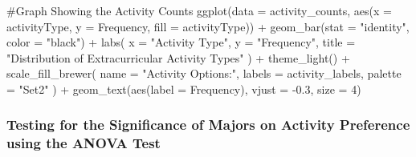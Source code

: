\documentclass[
  letterpaper,
  DIV=11,
  numbers=noendperiod]{scrartcl}
\newenvironment{Shaded}{\begin{snugshade}}{\end{snugshade}}
\newcommand{\AttributeTok}[1]{\textcolor[rgb]{0.40,0.45,0.13}{#1}}
\newcommand{\CommentTok}[1]{\textcolor[rgb]{0.37,0.37,0.37}{#1}}
\newcommand{\DecValTok}[1]{\textcolor[rgb]{0.68,0.00,0.00}{#1}}
\newcommand{\FloatTok}[1]{\textcolor[rgb]{0.68,0.00,0.00}{#1}}
\newcommand{\FunctionTok}[1]{\textcolor[rgb]{0.28,0.35,0.67}{#1}}
\newcommand{\NormalTok}[1]{\textcolor[rgb]{0.00,0.23,0.31}{#1}}
\newcommand{\SpecialCharTok}[1]{\textcolor[rgb]{0.37,0.37,0.37}{#1}}
\newcommand{\StringTok}[1]{\textcolor[rgb]{0.13,0.47,0.30}{#1}}
\begin{document}
\begin{Shaded}
\begin{Highlighting}[]
\CommentTok{\#Graph Showing the Activity Counts}
\FunctionTok{ggplot}\NormalTok{(}\AttributeTok{data =}\NormalTok{ activity\_counts, }\FunctionTok{aes}\NormalTok{(}\AttributeTok{x =}\NormalTok{ activityType, }\AttributeTok{y =}\NormalTok{ Frequency, }
                                   \AttributeTok{fill =}\NormalTok{ activityType)) }\SpecialCharTok{+}
  \FunctionTok{geom\_bar}\NormalTok{(}\AttributeTok{stat =} \StringTok{"identity"}\NormalTok{, }\AttributeTok{color =} \StringTok{"black"}\NormalTok{) }\SpecialCharTok{+}
  \FunctionTok{labs}\NormalTok{(}
    \AttributeTok{x =} \StringTok{"Activity Type"}\NormalTok{,}
    \AttributeTok{y =} \StringTok{"Frequency"}\NormalTok{,}
    \AttributeTok{title =} \StringTok{"Distribution of Extracurricular Activity Types"}
\NormalTok{  ) }\SpecialCharTok{+}
  \FunctionTok{theme\_light}\NormalTok{() }\SpecialCharTok{+}
  \FunctionTok{scale\_fill\_brewer}\NormalTok{(}
    \AttributeTok{name =} \StringTok{"Activity Options:"}\NormalTok{,}
    \AttributeTok{labels =}\NormalTok{ activity\_labels,  }
    \AttributeTok{palette =} \StringTok{"Set2"}  
\NormalTok{  ) }\SpecialCharTok{+}
  \FunctionTok{geom\_text}\NormalTok{(}\FunctionTok{aes}\NormalTok{(}\AttributeTok{label =}\NormalTok{ Frequency), }\AttributeTok{vjust =} \SpecialCharTok{{-}}\FloatTok{0.3}\NormalTok{, }\AttributeTok{size =} \DecValTok{4}\NormalTok{)}
\end{Highlighting}
\end{Shaded}

\subsubsection{Testing for the Significance of Majors on Activity
Preference using the ANOVA
Test}\label{testing-for-the-significance-of-majors-on-activity-preference-using-the-anova-test}
\end{document}
